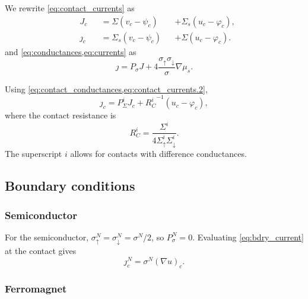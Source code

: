 We rewrite \cref{eq:contact_currents} as
\begin{subequations}
  \label{eq:contact_currents.2}
  \begin{alignat}{3}
    \label{eq:contact_currents.2.current}
    & J_c && = Σ   \left( v_c - ψ_c \right) && + Σ_s \left( u_c - φ_c \right) , \\
    \label{eq:contact_currents.2.spincurrent}
    & ȷ_c && = Σ_s \left( v_c - ψ_c \right) && + Σ   \left( u_c - φ_c \right) .
  \end{alignat}
\end{subequations}
and \cref{eq:conductances,eq:currents} as
\begin{equation}
  \label{eq:bdry_current}
  ȷ = P_σ J + 4 \frac{σ_↑ σ_↓}{σ} ∇μ_s .
\end{equation}

Using \cref{eq:contact_conductances,eq:contact_currents.2},
\begin{equation}
  \label{eq:bdry_current_contact}
  ȷ_c = P_Σ^i J_c + {R_C^i}^{-1} \left( u_c - φ_c \right) ,
\end{equation}
where the contact resistance is
\begin{equation}
  R_C^i = \frac{Σ^i}{4 Σ_↑^i Σ_↓^i} .
\end{equation}
The superscript $i$ allows for contacts with difference conductances.

\subsection{Boundary conditions}

\subsubsection{Semiconductor}

For the semiconductor, $σ^N_↑ = σ^N_↓ = σ^N / 2$, so $P_σ^N = 0$.
Evaluating \cref{eq:bdry_current} at the contact gives
\begin{equation}
  \label{eq:bdry_current.semiconductor}
  ȷ^N_c = σ^N ( ∇u )_c .
\end{equation}

\subsubsection{Ferromagnet}

